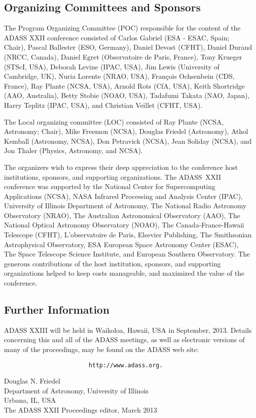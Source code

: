 \subsection{Organizing Committees and Sponsors}

The Program Organizing Committee (POC) responsible for the content of the ADASS XXII conference consisted of Carlos Gabriel (ESA - ESAC, Spain; Chair), Pascal Ballester (ESO, Germany), Daniel Devost (CFHT), Daniel Durand (NRCC, Canada), Daniel Egret (Observatoire de Paris, France), Tony Krueger (STScI, USA), Deborah Levine (IPAC, USA), Jim Lewis (University of Cambridge, UK), Nuria Lorente (NRAO, USA), François Ochsenbein (CDS, France), Ray Plante (NCSA, USA), Arnold Rots (CfA, USA), Keith Shortridge (AAO, Australia), Betty Stobie (NOAO, USA), Tadafumi Takata (NAO, Japan), Harry Teplitz (IPAC, USA), and Christian Veillet (CFHT, USA).

The Local organizing committee (LOC) consisted of Ray Plante (NCSA, Astronomy; Chair), Mike Freemon (NCSA), Douglas Friedel (Astronomy), Athol Kemball (Astronomy, NCSA), Don Petravick (NCSA), Jean Soliday (NCSA), and Jon Thaler (Physics, Astronomy, and NCSA).
    
The organizers wish to express their deep appreciation to the conference host institutions, sponsors, and supporting organizations. The ADASS~XXII conference was supported by the National Center for Supercomputing Applications (NCSA), NASA Infrared Processing and Analysis Center (IPAC), University of Illinois Department of Astronomy, The National Radio Astronomy Observatory (NRAO), The Australian Astronomical Observatory (AAO), The National Optical Astronomy Observatory (NOAO), The Canada-France-Hawaii Telescope (CFHT), L'observatoire de Paris, Elsevier Publishing, The Smithsonian Astrophysical Observatory, ESA European Space Astronomy Center (ESAC), The Space Telescope Science Institute, and European Southern Observatory. The generous contributions of the host institution, sponsors, and supporting organizations helped to keep costs manageable, and maximized the value of the conference.

\subsection{Further Information}

ADASS XXIII will be held in Waikoloa, Hawaii, USA in September, 2013. Details concerning this and all of the ADASS meetings, as well as electronic versions of many of the proceedings, may be found on the ADASS web site:
\begin{verbatim}
                        http://www.adass.org.
\end{verbatim}

\bigskip

\noindent Douglas N. Friedel\\
Department of Astronomy, University of Illinois\\
Urbana, IL, USA\\
The ADASS XXII Proceedings editor, March 2013
\vfill\eject
\thispagestyle{empty}
